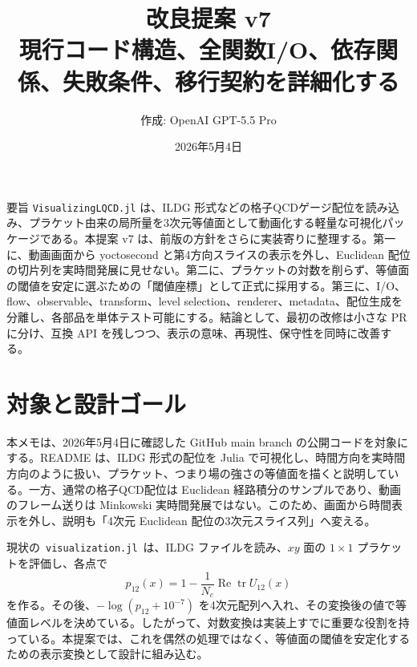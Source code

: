 \documentclass[uplatex,dvipdfmx,ja=standard,11pt,a4paper]{bxjsarticle}
\title{\Visualizing{} 改良提案 v7\\\large 現行コード構造、全関数I/O、依存関係、失敗条件、移行契約を詳細化する}
\author{作成: OpenAI GPT-5.5 Pro}
\date{2026年5月4日}
\newcommand{\tr}{\operatorname{tr}}
\newcommand{\Ree}{\operatorname{Re}}
\newcommand{\Nc}{N_c}
\newcommand{\Visualizing}{\texttt{VisualizingLQCD.jl}}
\newcommand{\code}[1]{\texttt{#1}}
\begin{document}
\maketitle

\begin{summarybox}{要旨}
\Visualizing{} は、ILDG 形式などの格子QCDゲージ配位を読み込み、プラケット由来の局所量を3次元等値面として動画化する軽量な可視化パッケージである。本提案 v7 は、前版の方針をさらに実装寄りに整理する。第一に、動画画面から yoctosecond と第4方向スライスの表示を外し、Euclidean 配位の切片列を実時間発展に見せない。第二に、プラケットの対数を削らず、等値面の閾値を安定に選ぶための「閾値座標」として正式に採用する。第三に、I/O、flow、observable、transform、level selection、renderer、metadata、配位生成を分離し、各部品を単体テスト可能にする。結論として、最初の改修は小さな PR に分け、互換 API を残しつつ、表示の意味、再現性、保守性を同時に改善する。
\end{summarybox}

\tableofcontents
\clearpage

\section{対象と設計ゴール}
本メモは、2026年5月4日に確認した GitHub main branch の公開コードを対象にする。README は、ILDG 形式の配位を Julia で可視化し、時間方向を実時間方向のように扱い、プラケット、つまり場の強さの等値面を描くと説明している\cite{VisualizingReadme}。一方、通常の格子QCD配位は Euclidean 経路積分のサンプルであり、動画のフレーム送りは Minkowski 実時間発展ではない。このため、画面から時間表示を外し、説明も「4次元 Euclidean 配位の3次元スライス列」へ変える。

現状の \,\code{visualization.jl}\, は、ILDG ファイルを読み、\(xy\) 面の \(1\times1\) プラケットを評価し、各点で
\begin{equation}
  p_{12}(x)=1-\frac{1}{\Nc}\Ree\tr U_{12}(x)
\end{equation}
を作る。その後、\(-\log(p_{12}+10^{-7})\) を4次元配列へ入れ、その変換後の値で等値面レベルを決めている\cite{VisualizingVisualization}。したがって、対数変換は実装上すでに重要な役割を持っている。本提案では、これを偶然の処理ではなく、等値面の閾値を安定化するための表示変換として設計に組み込む。
\end{document}

